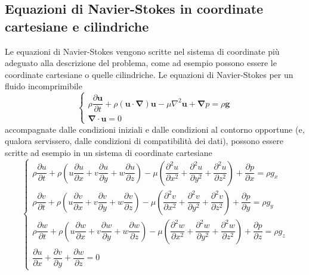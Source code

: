 \subsection{Equazioni di Navier-Stokes in coordinate cartesiane e cilindriche}
Le equazioni di Navier-Stokes vengono scritte nel sistema di coordinate 
 più adeguato alla descrizione del problema, come ad
 esempio possono essere le coordinate cartesiane o quelle cilindriche.
Le equazioni di Navier-Stokes per un fluido incomprimibile
\begin{equation}
\begin{cases}
 \rho \dfrac{\partial \bm{u}}{\partial t}
 + \rho (\bm{u} \cdot \bm{\nabla}) \bm{u}
 - \mu \nabla^2 \bm{u} + \bm{\nabla} p = \rho \bm{g} \\
 \bm{\nabla} \cdot \bm{u} = 0
\end{cases}
\end{equation}
accompagnate dalle condizioni iniziali e dalle condizioni al contorno
 opportune (e, qualora servissero, dalle condizioni di compatibilità dei 
 dati), possono essere scritte ad esempio in un sistema di coordinate
 cartesiane
\begin{equation}
\begin{cases}
  \rho \dfrac{\partial u}{\partial t}
  + \rho \left( u \dfrac{\partial u}{\partial x}
  + v  \dfrac{\partial u}{\partial y}
  + w  \dfrac{\partial u}{\partial z} \right)- \mu \left( 
  \dfrac{\partial^2 u}{\partial x^2} +
  \dfrac{\partial^2 u}{\partial y^2} +
  \dfrac{\partial^2 u}{\partial z^2} \right)
  + \dfrac{\partial p}{\partial x} = \rho g_x \\
  \rho \dfrac{\partial v}{\partial t}
  + \rho \left( u \dfrac{\partial v}{\partial x}
  + v  \dfrac{\partial v}{\partial y}
  + w  \dfrac{\partial v}{\partial z} \right)- \mu \left( 
  \dfrac{\partial^2 v}{\partial x^2} +
  \dfrac{\partial^2 v}{\partial y^2} +
  \dfrac{\partial^2 v}{\partial z^2} \right)
  + \dfrac{\partial p}{\partial y} = \rho g_y \\
  \rho \dfrac{\partial w}{\partial t} + 
  \rho \left( u \dfrac{\partial w}{\partial x}
  + v \dfrac{\partial w}{\partial y} 
  + w \dfrac{\partial w}{\partial z} \right)- \mu \left( 
  \dfrac{\partial^2 w}{\partial x^2} +
  \dfrac{\partial^2 w}{\partial y^2} +
  \dfrac{\partial^2 w}{\partial z^2} \right)
  + \dfrac{\partial p}{\partial z} = \rho g_z \\
  \dfrac{\partial u}{\partial x}
+ \dfrac{\partial v}{\partial y}
+ \dfrac{\partial w}{\partial z} = 0
\end{cases}
\end{equation}
